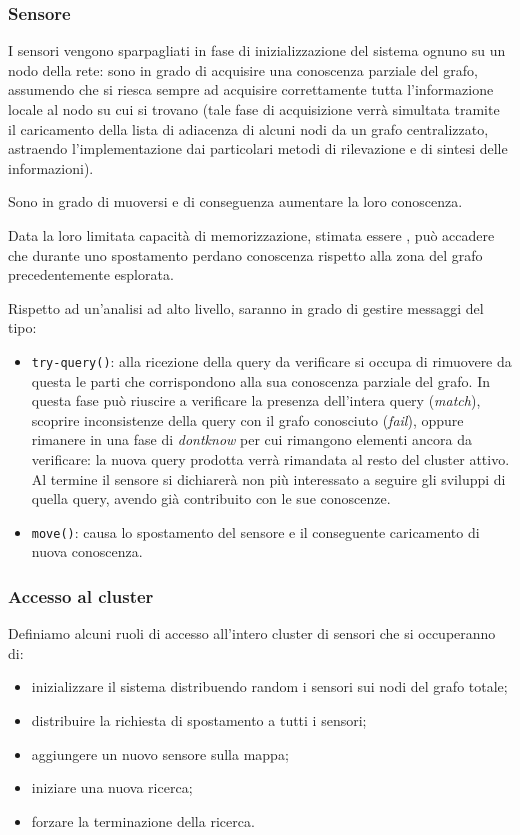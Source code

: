 \documentclass{llncs}
\begin{document}
\subsubsection*{Sensore}
I sensori vengono sparpagliati in fase di inizializzazione del
sistema ognuno su un nodo della rete: sono in grado di
acquisire una conoscenza parziale del grafo, assumendo che si
riesca sempre ad acquisire correttamente tutta l'informazione
locale al nodo su cui si trovano
(tale fase di acquisizione verrà simultata tramite il caricamento
della lista di adiacenza di alcuni nodi da un grafo centralizzato,
astraendo l'implementazione dai particolari metodi di
rilevazione e di sintesi delle informazioni).

Sono in grado di muoversi e di conseguenza aumentare la loro
conoscenza.

Data la loro limitata capacità di memorizzazione,
stimata essere ,
può accadere che
durante uno spostamento perdano conoscenza rispetto alla zona del
grafo precedentemente esplorata.

Rispetto ad un'analisi ad alto livello,
saranno in grado di gestire messaggi del tipo:
\begin{itemize}
\item \texttt{try-query()}: alla ricezione della query da verificare
  si occupa di rimuovere da questa le parti che corrispondono alla
  sua conoscenza parziale del grafo. In questa fase può riuscire a
  verificare la presenza dell'intera query (\emph{match}),
  scoprire inconsistenze della query con il grafo conosciuto
  (\emph{fail}), oppure rimanere in una fase di \emph{dontknow}
  per cui rimangono elementi ancora da verificare: la nuova query
  prodotta verrà rimandata al resto del cluster attivo.
  Al termine il sensore si dichiarerà non più interessato a seguire
  gli sviluppi di quella query, avendo già contribuito con le
  sue conoscenze.
\item \texttt{move()}: causa lo spostamento del sensore e il
  conseguente caricamento di nuova conoscenza.
\end{itemize}

\subsubsection*{Accesso al cluster}
Definiamo alcuni ruoli di accesso all'intero cluster di sensori
che si occuperanno di:
\begin{itemize}
\item inizializzare il sistema distribuendo random i sensori sui
  nodi del grafo totale;
\item distribuire la richiesta di spostamento a tutti i sensori;
\item aggiungere un nuovo sensore sulla mappa;
\item iniziare una nuova ricerca;
\item forzare la terminazione della ricerca.
\end{itemize}
\end{document}
